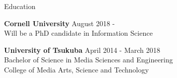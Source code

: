 \documentclass{resume} %
\begin{document}

\begin{rSection}{Education}

{\bf Cornell University} \hfill {August 2018 - }
\\ Will be a PhD candidate in Information Science

{\bf University of Tsukuba} \hfill {April 2014 - March 2018}
\\ Bachelor of Science in Media Sciences and Engineering
\\ College of Media Arts, Science and Technology


\end{rSection}

\end{document}
